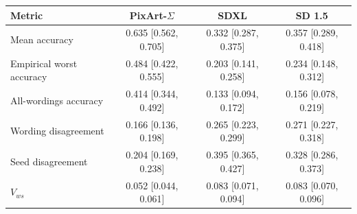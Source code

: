 \begin{tabular}{@{}lccc@{}}
\toprule
Metric & PixArt-$\Sigma$ & SDXL & SD 1.5 \\
\midrule
Mean accuracy & 0.635 [0.562, 0.705] & 0.332 [0.287, 0.375] & 0.357 [0.289, 0.418] \\
Empirical worst accuracy & 0.484 [0.422, 0.555] & 0.203 [0.141, 0.258] & 0.234 [0.148, 0.312] \\
All-wordings accuracy & 0.414 [0.344, 0.492] & 0.133 [0.094, 0.172] & 0.156 [0.078, 0.219] \\
Wording disagreement & 0.166 [0.136, 0.198] & 0.265 [0.223, 0.299] & 0.271 [0.227, 0.318] \\
Seed disagreement & 0.204 [0.169, 0.238] & 0.395 [0.365, 0.427] & 0.328 [0.286, 0.373] \\
$V_{ws}$ & 0.052 [0.044, 0.061] & 0.083 [0.071, 0.094] & 0.083 [0.070, 0.096] \\
\bottomrule
\end{tabular}
